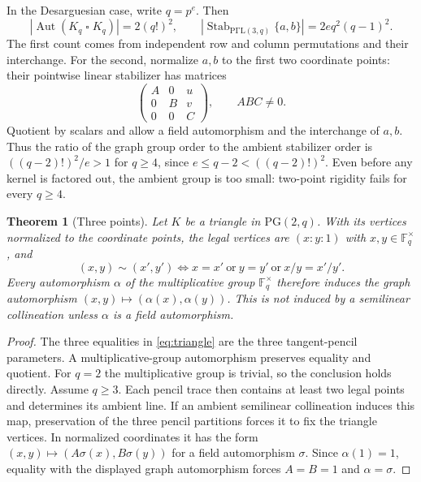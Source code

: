 \documentclass[11pt]{article}
\newtheorem{theorem}{Theorem}[section]
\theoremstyle{definition}
\theoremstyle{remark}
\newcommand{\F}{\mathbb F}
\newcommand{\PG}{\mathrm{PG}}
\newcommand{\PGammaL}{\mathrm{P\Gamma L}}
\newcommand{\Aut}{\operatorname{Aut}}
\newcommand{\Stab}{\operatorname{Stab}}
\begin{document}
In the Desarguesian case, write $q=p^e$. Then
\[
 |\Aut(K_q\mathbin{\square}K_q)|=2(q!)^2,
 \qquad |\Stab_{\PGammaL(3,q)}\{a,b\}|=2e q^2(q-1)^2.
\]
The first count comes from independent row and column permutations and
their interchange. For the second, normalize $a,b$ to the first two
coordinate points: their pointwise linear stabilizer has matrices
\[
 \begin{pmatrix} A&0&u\\0&B&v\\0&0&C\end{pmatrix},
 \qquad ABC\ne0.
\]
Quotient by scalars and allow a field automorphism and the interchange
of $a,b$. Thus the ratio of the graph group order to the ambient
stabilizer order is $((q-2)!)^2/e>1$ for $q\ge4$, since
$e\le q-2<((q-2)!)^2$. Even before any kernel is factored out,
the ambient group is too small: two-point rigidity fails for every $q\ge4$.

\begin{theorem}[Three points]\label{thm:triangle}
Let $K$ be a triangle in $\PG(2,q)$.  With its vertices normalized to the
coordinate points, the legal vertices are $(x:y:1)$ with
$x,y\in\F_q^\times$, and
\begin{equation}
 (x,y)\sim(x',y')
 \Longleftrightarrow
 x=x'\ \text{or}\ y=y'\ \text{or}\ x/y=x'/y'.
 \label{eq:triangle}
\end{equation}
Every automorphism $\alpha$ of the multiplicative group $\F_q^\times$ therefore
induces the graph automorphism $(x,y)\mapsto(\alpha(x),\alpha(y))$.  This is
not induced by a semilinear collineation unless $\alpha$ is a field
automorphism.
\end{theorem}

\begin{proof}
The three equalities in \eqref{eq:triangle} are the three tangent-pencil parameters.  A
multiplicative-group automorphism preserves equality and quotient. For $q=2$
the multiplicative group is trivial, so the conclusion holds directly.
Assume $q\ge3$. Each pencil trace then contains at least two legal points
and determines its ambient line. If an
ambient semilinear collineation induces this map, preservation of the three
pencil partitions forces it to fix the triangle vertices.  In normalized
coordinates it has the form
$(x,y)\mapsto(A\sigma(x),B\sigma(y))$ for a field automorphism $\sigma$.
Since $\alpha(1)=1$, equality with the displayed graph automorphism forces
$A=B=1$ and $\alpha=\sigma$.
\end{proof}
\end{document}
